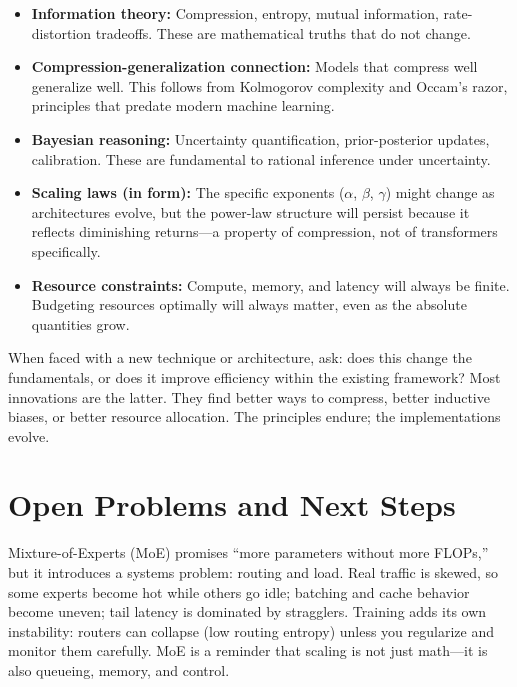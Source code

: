 \begin{itemize}
\item \textbf{Information theory:} Compression, entropy, mutual information, rate-distortion tradeoffs. These are mathematical truths that do not change.
\item \textbf{Compression-generalization connection:} Models that compress well generalize well. This follows from Kolmogorov complexity and Occam's razor, principles that predate modern machine learning.
\item \textbf{Bayesian reasoning:} Uncertainty quantification, prior-posterior updates, calibration. These are fundamental to rational inference under uncertainty.
\item \textbf{Scaling laws (in form):} The specific exponents ($\alpha$, $\beta$, $\gamma$) might change as architectures evolve, but the power-law structure will persist because it reflects diminishing returns---a property of compression, not of transformers specifically.
\item \textbf{Resource constraints:} Compute, memory, and latency will always be finite. Budgeting resources optimally will always matter, even as the absolute quantities grow.
\end{itemize}

When faced with a new technique or architecture, ask: does this change the fundamentals, or does it improve efficiency within the existing framework? Most innovations are the latter. They find better ways to compress, better inductive biases, or better resource allocation. The principles endure; the implementations evolve.

\vspace{2em}

\section{Open Problems and Next Steps}
\vspace{0.3cm}
\begin{pausebox}[title=Depth: Why Mixture-of-Experts is hard in production]
Mixture-of-Experts (MoE) promises ``more parameters without more FLOPs,'' but it introduces a systems problem: routing and load. Real traffic is skewed, so some experts become hot while others go idle; batching and cache behavior become uneven; tail latency is dominated by stragglers. Training adds its own instability: routers can collapse (low routing entropy) unless you regularize and monitor them carefully. MoE is a reminder that scaling is not just math---it is also queueing, memory, and control.
\end{pausebox}

